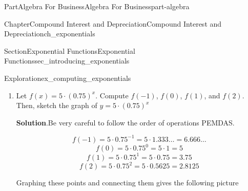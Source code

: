 \documentclass{tufte-book}
\newcommand{\blocktitlefont}{\relax}
\numberwithin{equation}{chapter}
\begin{document}
\begin{partptx}{Part}{Algebra For Business}{}{Algebra For Business}{}{}{part-algebra}
\begin{chapterptx}{Chapter}{Compound Interest and Depreciation}{}{Compound Interest and Depreciation}{}{}{ch_exponentials}
\begin{sectionptx}{Section}{Exponential Functions}{}{Exponential Functions}{}{}{sec_introducing_exponentials}
\begin{exploration}{Exploration}{}{ex_computing_exponentials}
\begin{enumerate}[font=\bfseries,label=(\alph*),ref=\alph*]
\begin{image}{0.25}{0.5}{0.25}{}
{
}%
\end{image}%
\item{}Let \(f(x) = 5\cdot (0.75)^x\). Compute  \(f(-1)\), \(f(0)\), \(f(1)\), and \(f(2)\). Then, sketch the graph of \(y=5\cdot (0.75)^x\)%
\par\smallskip%
\noindent\textbf{\blocktitlefont Solution}.\hypertarget{ex_computing_exponentials-3-2}{}\quad{}Be very careful to follow the order of operations PEMDAS.%
\par
%
\begin{equation*}
f(-1) = 5\cdot 0.75^{-1} = 5 \cdot 1.333\dots  = 6.666\dots
\end{equation*}
%
\begin{equation*}
f(0) = 5\cdot 0.75^{0} = 5 \cdot 1 = 5
\end{equation*}
%
\begin{equation*}
f(1) = 5\cdot 0.75^{1} = 5 \cdot 0.75 = 3.75
\end{equation*}
%
\begin{equation*}
f(2) = 5\cdot 0.75^{2} = 5 \cdot 0.5625 = 2.8125
\end{equation*}
%
\par
Graphing these points and connecting them gives the following picture%
\begin{image}{0.25}{0.5}{0.25}{}%
\end{image}
\end{enumerate}
\end{exploration}
\end{sectionptx}
\end{chapterptx}
\end{partptx}
\end{document}
